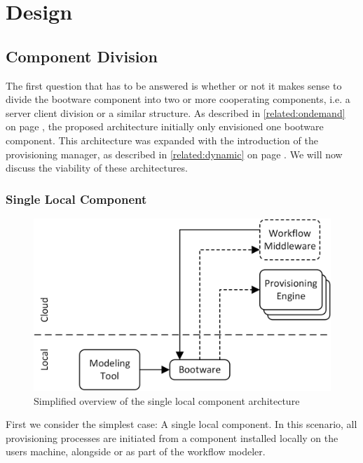 \section{Design}

\subsection{Component Division}

The first question that has to be answered is whether or not it makes sense to divide the bootware component into two or more cooperating components, i.e. a server client division or a similar structure.
As described in \autoref{related:ondemand} on page \pageref{related:ondemand}, the proposed architecture initially only envisioned one bootware component.
This architecture was expanded with the introduction of the provisioning manager, as described in \autoref{related:dynamic} on page \pageref{related:dynamic}.
We will now discuss the viability of these architectures.

\subsubsection{Single Local Component}

\begin{figure}[!htbp]
	\centering
	\includegraphics[resolution=600]{design/assets/simple_local}
	\caption{Simplified overview of the single local component architecture}
	\label{image:single_local}
\end{figure}

First we consider the simplest case: A single local component.
In this scenario, all provisioning processes are initiated from a component installed locally on the users machine, alongside or as part of the workflow modeler.

